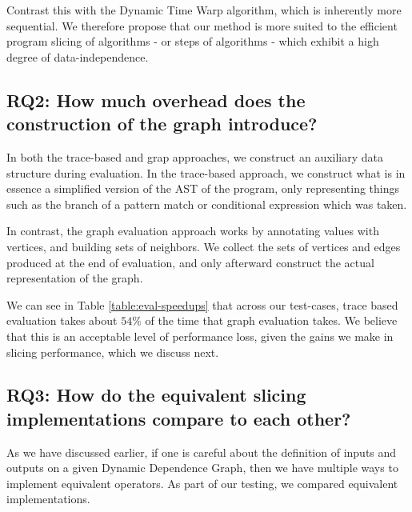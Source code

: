 Contrast this with the Dynamic Time Warp algorithm, which is inherently more
sequential. We therefore propose that our method is more suited to the efficient
program slicing of algorithms - or steps of algorithms - which exhibit a high
degree of data-independence.

{\tiny}

\subsection{RQ2: How much overhead does the construction of the graph introduce?}


In both the trace-based and grap approaches, we construct an auxiliary data
structure during evaluation. In the trace-based approach, we construct what is
in essence a simplified version of the AST of the program, only representing
things such as the branch of a pattern match or conditional expression which
was taken.

In contrast, the graph evaluation approach works by annotating values with
vertices, and building sets of neighbors. We collect the sets of vertices and
edges produced at the end of evaluation, and only afterward construct the actual
representation of the graph.

We can see in Table \ref{table:eval-speedups} that across our test-cases, trace
based evaluation takes about $54\%$ of the time that graph evaluation takes. We
believe that this is an acceptable level of performance loss, given the gains we
make in slicing performance, which we discuss next.
{\tiny}

\subsection{RQ3: How do the equivalent slicing implementations compare to each other?}
As we have discussed earlier, if one is careful about the definition of inputs
and outputs on a given Dynamic Dependence Graph, then we have multiple ways to
implement equivalent operators. As part of our testing, we compared equivalent
implementations.

